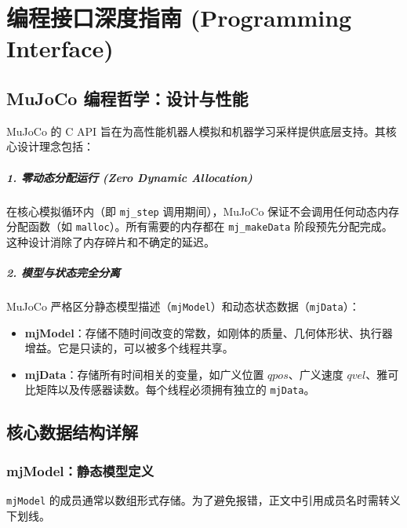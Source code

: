 \documentclass[11pt,a4paper]{book}
\begin{document}
\chapter{编程接口深度指南 (Programming Interface)}

\section{MuJoCo 编程哲学：设计与性能}
MuJoCo 的 C API 旨在为高性能机器人模拟和机器学习采样提供底层支持。其核心设计理念包括：

\paragraph{1. 零动态分配运行 (Zero Dynamic Allocation)} 
在核心模拟循环内（即 \texttt{mj\_step} 调用期间），MuJoCo 保证不会调用任何动态内存分配函数（如 \texttt{malloc}）。所有需要的内存都在 \texttt{mj\_makeData} 阶段预先分配完成。这种设计消除了内存碎片和不确定的延迟。

\paragraph{2. 模型与状态完全分离} 
MuJoCo 严格区分静态模型描述（\texttt{mjModel}）和动态状态数据（\texttt{mjData}）：
\begin{itemize}
    \item \textbf{mjModel}：存储不随时间改变的常数，如刚体的质量、几何体形状、执行器增益。它是只读的，可以被多个线程共享。
    \item \textbf{mjData}：存储所有时间相关的变量，如广义位置 $qpos$、广义速度 $qvel$、雅可比矩阵以及传感器读数。每个线程必须拥有独立的 \texttt{mjData}。
\end{itemize}

\section{核心数据结构详解}

\subsection{mjModel：静态模型定义}
\texttt{mjModel} 的成员通常以数组形式存储。为了避免报错，正文中引用成员名时需转义下划线。
\end{document}
